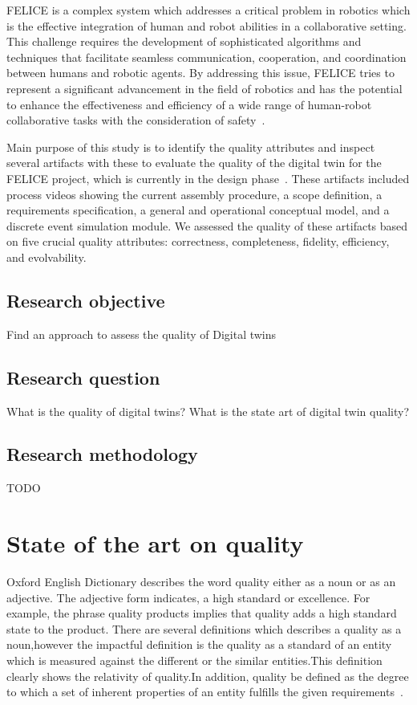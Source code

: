 \documentclass{llncs}
\begin{document}
    FELICE is a complex system which  addresses a critical problem in robotics which is the effective integration of human and robot abilities in a collaborative setting. 
    This challenge requires the development of sophisticated algorithms and techniques that facilitate seamless communication, cooperation, and coordination between humans and robotic agents. 
    By addressing this issue, FELICE tries to represent a significant advancement in the field of robotics and has the potential to enhance the effectiveness and efficiency of a wide range of 
    human-robot collaborative tasks with the consideration of safety~\cite{FELICE}.

    Main purpose of this study is to identify the quality attributes and inspect several artifacts 
    with these to evaluate the quality of the digital twin for the FELICE project, 
    which is currently in the design phase~\cite{FELICE}. These artifacts included process videos showing the current 
    assembly procedure, a scope definition, a requirements specification, a general and operational conceptual model, 
    and a discrete event simulation module. We assessed the quality of these artifacts 
    based on five crucial quality attributes: correctness, completeness, fidelity, efficiency, and evolvability.

    \subsection{Research objective}
    Find an approach to assess the quality of Digital twins~\cite{Jones2020}

    \subsection{Research question}\label{section: Research Questions}
    What is the quality of digital twins?
    What is the state art of digital twin quality?

    \subsection{Research methodology}
    TODO

    \section{State of the art on quality}
    Oxford English Dictionary describes the word quality  either as a noun or as an adjective. 
    The adjective form indicates, a high standard or excellence. For example, the phrase quality products implies 
    that quality adds a high standard state to the product. There are several definitions which describes a quality 
    as a noun,however the impactful definition is the quality as a standard of an entity which is measured against the 
    different or the similar entities\cite{OxfordDictionary}.This definition clearly shows the relativity of quality.In addition, quality be defined 
    as the degree to which a set of inherent properties of an entity fulfills the given requirements~\cite{ISO9000}.    
\end{document}
